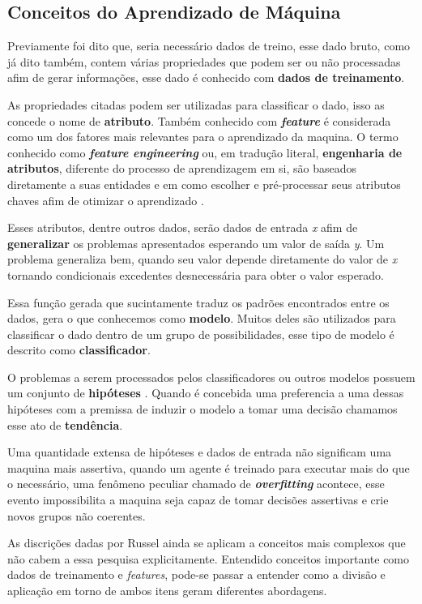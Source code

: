\subsection{Conceitos do Aprendizado de Máquina}
Previamente foi dito que, seria necessário dados de treino, esse dado bruto, como já dito também, contem várias propriedades que podem ser ou não processadas afim de gerar informações, esse dado é conhecido com \textbf{dados de treinamento}.

As propriedades citadas podem ser utilizadas para classificar o dado, isso as concede o nome de \textbf{atributo}. Também conhecido com \textbf{\textit{feature}} é considerada como um dos fatores mais relevantes para o aprendizado da maquina. O termo conhecido como \textbf{\textit{feature engineering}} ou, em tradução literal, \textbf{engenharia de atributos}, diferente do processo de aprendizagem em si, são baseados diretamente a suas entidades e em como escolher e pré-processar seus atributos chaves afim de otimizar o aprendizado \cite{domingos2012few}.

Esses atributos, dentre outros dados, serão dados de entrada \textit{x} afim de \textbf{generalizar} os problemas apresentados esperando um valor de saída \textit{y}. Um problema generaliza bem, quando seu valor depende diretamente do valor de \textit{x} tornando condicionais excedentes desnecessária para obter o valor esperado.

Essa função gerada que sucintamente traduz os padrões encontrados entre os dados, gera o que conhecemos como \textbf{modelo}. Muitos deles são utilizados para classificar o dado dentro de um grupo de possibilidades, esse tipo de modelo é descrito como \textbf{classificador}.

O problemas a serem processados pelos classificadores ou outros modelos possuem um conjunto de \textbf{ hipóteses }. Quando é concebida uma preferencia a uma dessas hipóteses com a premissa de induzir o modelo a tomar uma decisão chamamos esse ato de \textbf{tendência}.

Uma quantidade extensa de hipóteses e dados de entrada não significam uma maquina mais assertiva, quando um agente é treinado para executar mais do que o necessário, uma fenômeno peculiar chamado de \textbf{\textit{overfitting}} acontece, esse evento impossibilita a maquina seja capaz de tomar decisões assertivas e crie novos grupos não coerentes.

As discrições dadas por Russel \cite[693]{russell2003artificial} ainda se aplicam a conceitos mais complexos que não cabem a essa pesquisa explicitamente. Entendido conceitos importante como dados de treinamento e \textit{features}, pode-se passar a entender como a divisão e aplicação em torno de ambos itens geram diferentes abordagens.

